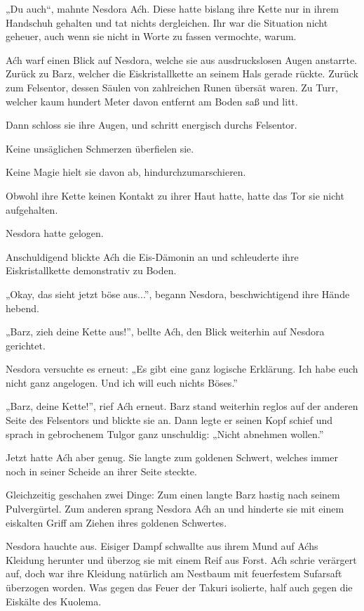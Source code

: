 „Du auch“, mahnte Nesdora Aćh. Diese hatte bislang ihre Kette nur in ihrem Handschuh gehalten und tat nichts dergleichen. Ihr war die Situation nicht geheuer, auch wenn sie nicht in Worte zu fassen vermochte, warum.

Aćh warf einen Blick auf Nesdora, welche sie aus ausdruckslosen Augen anstarrte. Zurück zu Barz, welcher die Eiskristallkette an seinem Hals gerade rückte. Zurück zum Felsentor, dessen Säulen von zahlreichen Runen übersät waren. Zu Turr, welcher kaum hundert Meter davon entfernt am Boden saß und litt.

Dann schloss sie ihre Augen, und schritt energisch durchs Felsentor.

Keine unsäglichen Schmerzen überfielen sie.

Keine Magie hielt sie davon ab, hindurchzumarschieren.

Obwohl ihre Kette keinen Kontakt zu ihrer Haut hatte, hatte das Tor sie nicht aufgehalten.

Nesdora hatte gelogen.

Anschuldigend blickte Aćh die Eis-Dämonin an und schleuderte ihre Eiskristallkette demonstrativ zu Boden.

„Okay, das sieht jetzt böse aus...”, begann Nesdora, beschwichtigend ihre Hände hebend.

„Barz, zieh deine Kette aus!”, bellte Aćh, den Blick weiterhin auf Nesdora gerichtet.

Nesdora versuchte es erneut: „Es gibt eine ganz logische Erklärung. Ich habe euch nicht ganz angelogen. Und ich will euch nichts Böses.”

„Barz, deine Kette!”, rief Aćh erneut. Barz stand weiterhin reglos auf der anderen Seite des Felsentors und blickte sie an. Dann legte er seinen Kopf schief und sprach in gebrochenem Tulgor ganz unschuldig: „Nicht abnehmen wollen.”

Jetzt hatte Aćh aber genug. Sie langte zum goldenen Schwert, welches immer noch in seiner Scheide an ihrer Seite steckte.

Gleichzeitig geschahen zwei Dinge: Zum einen langte Barz hastig nach seinem Pulvergürtel. Zum anderen sprang Nesdora Aćh an und hinderte sie mit einem eiskalten Griff am Ziehen ihres goldenen Schwertes.

Nesdora hauchte aus. Eisiger Dampf schwallte aus ihrem Mund auf Aćhs Kleidung herunter und überzog sie mit einem Reif aus Forst. Aćh schrie verärgert auf, doch war ihre Kleidung natürlich am Nestbaum mit feuerfestem Sufarsaft überzogen worden. Was gegen das Feuer der Takuri isolierte, half auch gegen die Eiskälte des Kuolema.

